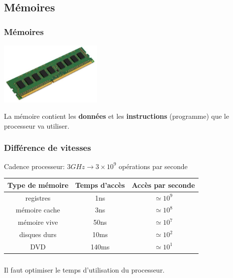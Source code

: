 \documentclass[svgnames,11pt]{beamer}
\begin{document}
\subsection{Mémoires}
\begin{frame}
    \frametitle{Mémoires}

    \begin{center}
    \centering
    \includegraphics[width=5cm]{ressources/barrette.jpg}
    \label{IMG}
    \end{center}
\begin{aretenir}[]
La mémoire contient les \textbf{données} et les \textbf{instructions} (programme) que le processeur va utiliser.
\end{aretenir}
\end{frame}
\begin{frame}
    \frametitle{Différence de vitesses}

    \begin{center}
        Cadence processeur: $3GHz \rightarrow 3×10^9$ opérations par seconde
    \end{center}
    \begin{tabular}{|*{3}{c|}}
        \hline 
        Type de mémoire & Temps d'accès & Accès par seconde \\ 
        \hline 
        registres & 1ns &$\simeq 10^9$ \\ 
        \hline 
        mémoire cache & 3ns &$\simeq 10^8$ \\
        \hline
        mémoire vive & 50ns &$\simeq 10^7$ \\
        \hline
        disques durs & 10ms & $\simeq 10^2$ \\
        \hline
        DVD & 140ms&$\simeq 10^1$ \\
        \hline
        \end{tabular} 

\end{frame}
\begin{frame}
    \frametitle{}

    \begin{center}
        {\Large Il faut optimiser le temps d'utilisation du processeur.}
    \end{center}

\end{frame}
\end{document}
